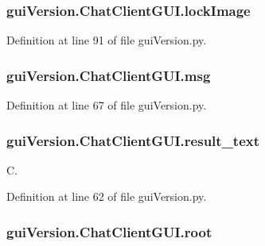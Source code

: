 \subsubsection[{lock\+Image}]{\setlength{\rightskip}{0pt plus 5cm}gui\+Version.\+Chat\+Client\+G\+U\+I.\+lock\+Image}\label{classgui_version_1_1_chat_client_g_u_i_af4e157319d9a46549b533d5718e8d114}


Definition at line 91 of file gui\+Version.\+py.

\hypertarget{classgui_version_1_1_chat_client_g_u_i_a44a52021282a7dc6c04aa10b77d829e9}{}
\subsubsection[{msg}]{\setlength{\rightskip}{0pt plus 5cm}gui\+Version.\+Chat\+Client\+G\+U\+I.\+msg}\label{classgui_version_1_1_chat_client_g_u_i_a44a52021282a7dc6c04aa10b77d829e9}


Definition at line 67 of file gui\+Version.\+py.

\hypertarget{classgui_version_1_1_chat_client_g_u_i_aed7ce16822dd2da856987bb7dbca00f7}{}
\subsubsection[{result\+\_\+text}]{\setlength{\rightskip}{0pt plus 5cm}gui\+Version.\+Chat\+Client\+G\+U\+I.\+result\+\_\+text}\label{classgui_version_1_1_chat_client_g_u_i_aed7ce16822dd2da856987bb7dbca00f7}


C. 



Definition at line 62 of file gui\+Version.\+py.

\hypertarget{classgui_version_1_1_chat_client_g_u_i_afec7497b20c1d133c5c026c9625a1691}{}
\subsubsection[{root}]{\setlength{\rightskip}{0pt plus 5cm}gui\+Version.\+Chat\+Client\+G\+U\+I.\+root}\label{classgui_version_1_1_chat_client_g_u_i_afec7497b20c1d133c5c026c9625a1691}


